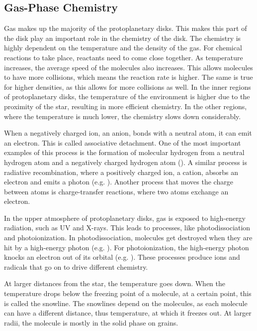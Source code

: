 \documentclass[oneside, single, authoryear, semicolon, 12pt]{lion-msc}
\newcommand{\4}{$_4$}
\newcommand{\3}{$_3$}
\newcommand{\2}{$_2$}
\begin{document}
\subsection{Gas-Phase Chemistry}
Gas makes up the majority of the protoplanetary disks. This makes this part of the disk play an important role in the chemistry of the disk. The chemistry is highly dependent on the temperature and the density of the gas. For chemical reactions to take place, reactants need to come close together. As temperature increases, the average speed of the molecules also increases. This allows molecules to have more collisions, which means the reaction rate is higher. The same is true for higher densities, as this allows for more collisions as well. In the inner regions of protoplanetary disks, the temperature of the environment is higher due to the proximity of the star, resulting in more efficient chemistry. In the other regions, where the temperature is much lower, the chemistry slows down considerably. 


When a negatively charged ion, an anion, bonds with a neutral atom, it can emit an electron. This is called associative detachment. One of the most important examples of this process is the formation of molecular hydrogen from a neutral hydrogen atom and a negatively charged hydrogen atom (). A similar process is radiative recombination, where a positively charged ion, a cation, absorbs an electron and emits a photon (e.g. ). Another process that moves the charge between atoms is charge-transfer reactions, where two atoms exchange an electron.

In the upper atmosphere of protoplanetary disks, gas is exposed to high-energy radiation, such as UV and X-rays. This leads to processes, like photodissociation and photoionization. In photodissociation, molecules get destroyed when they are hit by a high-energy photon (e.g. ). For photoionization, the high-energy photon knocks an electron out of its orbital (e.g.  ). These processes produce ions and radicals that go on to drive different chemistry. 

At larger distances from the star, the temperature goes down. When the temperature drops below the freezing point of a molecule, at a certain point, this is called the snowline. The snowlines depend on the molecules, as each molecule can have a different distance, thus temperature, at which it freezes out. At larger radii, the molecule is mostly in the solid phase on grains. 
\end{document}
